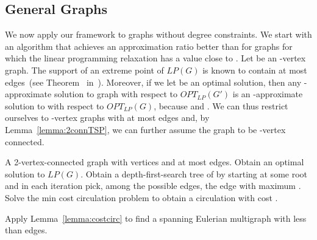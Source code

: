 \documentclass[letterpaper,11pt]{article}
\newcommand{\LP}[1]{\ensuremath{LP(#1)}}
\newcommand{\OLP}[1]{\ensuremath{OPT_{LP}(#1)}}
\begin{document}
\subsection{General Graphs}
We now apply our framework to graphs without degree constraints.  We
start with an algorithm that achieves an approximation ratio better
than  for graphs for which the linear programming relaxation has
a value close to .  Let  be an -vertex graph.  The
support  of an extreme point  of \LP{G} is
known to contain at most  edges~(see Theorem~
in~\cite{CFN85}). Moreover, if we let  be an optimal solution,
then any -approximate solution to graph  with respect to
\OLP{G'} is an -approximate solution to  with respect to
\OLP{G}, because  and . We can
thus restrict ourselves to -vertex graphs with at most  edges
and, by Lemma~\ref{lemma:2connTSP}, we can further assume the graph to
be -vertex connected.
\begin{algorithm}[h]
\begin{algorithmic}[1]
\REQUIRE A 2-vertex-connected graph  with  vertices and at most  edges.
\STATE Obtain an optimal solution  to \LP{G}.
\STATE Obtain a depth-first-search tree  of  by starting at some
  root and in each iteration pick, among the possible edges, the edge 
  with maximum .
\STATE Solve the min cost circulation problem  to obtain a circulation  with cost .

\STATE Apply Lemma~\ref{lemma:costcirc} to find a spanning Eulerian
  multigraph with less than  edges.
\end{algorithmic}
\caption{}
\label{alg:allgraphs}
\end{algorithm}
\end{document}
